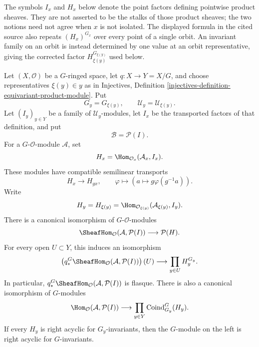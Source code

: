 \begin{lemma}
\label{lemma-equivariant-product-internal-hom}
\begin{reference}
\cite[Chapter V, \S 5.6, proof of Lemma 5.6.1, p. 215]{Tohoku}
\end{reference}
\begin{history}
The symbols $I_x$ and $H_x$ below denote the point factors defining
pointwise product sheaves. They are not asserted to be the stalks of those
product sheaves; the two notions need not agree when $x$ is not isolated.
The displayed formula in the cited source also repeats
$(H_x)^{G_x}$ over every point of a single orbit. An invariant family on
an orbit is instead determined by one value at an orbit representative,
giving the corrected factor $H_{\xi(y)}^{G_{\xi(y)}}$ used below.
\end{history}
Let $(X,\mathcal O)$ be a $G$-ringed space, let $q:X\to Y=X/G$, and
choose representatives $\xi(y)\in y$ as in Injectives, Definition
\ref{injectives-definition-equivariant-product-module}. Put
$$
G_y=G_{\xi(y)},
\qquad
\mathcal U_y=\mathcal U_{\xi(y)}.
$$
Let $(I_y)_{y\in Y}$ be a family of $\mathcal U_y$-modules, let $I_x$
be the transported factors of that definition, and put
$$
\mathcal B=\mathcal P(I).
$$
For a $G$-$\mathcal O$-module $\mathcal A$, set
$$
H_x=\Hom_{\mathcal O_x}(\mathcal A_x,I_x).
$$
These modules have compatible semilinear transports
$$
H_x\longrightarrow H_{gx},
\qquad
\varphi\longmapsto
\left(a\longmapsto g\varphi(g^{-1}a)\right).
$$
Write
$$
H_y=H_{\xi(y)}
=\Hom_{\mathcal O_{\xi(y)}}(\mathcal A_{\xi(y)},I_y).
$$
There is a canonical isomorphism of $G$-$\mathcal O$-modules
$$
\SheafHom_{\mathcal O}(\mathcal A,\mathcal P(I))
\longrightarrow
\mathcal P(H).
$$
For every open $U\subset Y$, this induces an isomorphism
$$
\left(
q_*^G\SheafHom_{\mathcal O}(\mathcal A,\mathcal P(I))
\right)(U)
\longrightarrow
\prod_{y\in U}H_y^{G_y}.
$$
In particular,
$q_*^G\SheafHom_{\mathcal O}(\mathcal A,\mathcal P(I))$
is flasque. There is also a canonical isomorphism of $G$-modules
$$
\Hom_{\mathcal O}(\mathcal A,\mathcal P(I))
\longrightarrow
\prod_{y\in Y}\operatorname{Coind}_{G_y}^G(H_y).
$$
If every $H_y$ is right acyclic for $G_y$-invariants, then the $G$-module
on the left is right acyclic for $G$-invariants.
\end{lemma}

